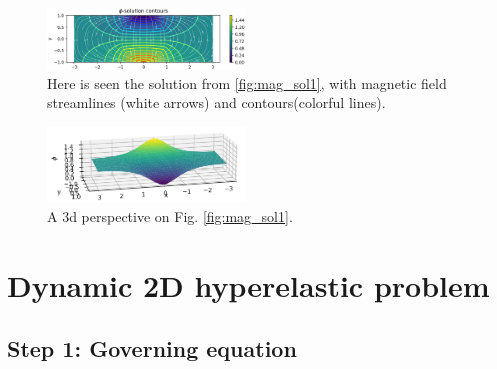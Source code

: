 \documentclass[acmtog]{acmart}
\begin{document}
\begin{figure}
  \centering
  \includegraphics[width=0.47\textwidth]{Images/field_lines.png}
  \caption{Here is seen the solution from \ref{fig:mag_sol1}, with magnetic field streamlines (white arrows) and contours(colorful lines).\label{fig:field_lines}}
\end{figure}

\begin{figure}
  \centering
  \includegraphics[width=0.47\textwidth]{Images/mag_sol1_3d.png}
  \caption{A 3d perspective on Fig. \ref{fig:mag_sol1}.\label{fig:mag_sol1_3d}}
\end{figure}



\section{Dynamic 2D hyperelastic problem}
\subsection*{Step 1: Governing equation}
\end{document}

